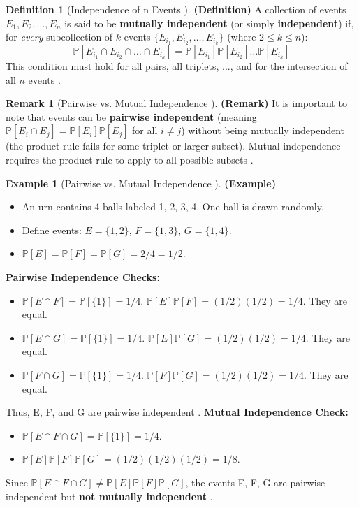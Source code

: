 \documentclass[12pt, a4paper]{article}
\theoremstyle{definition}
\newtheorem{definition}{Definition}[section]
\newtheorem{example}{Example}[section] %
\newtheorem{remark}{Remark}[section]
\theoremstyle{plain}
\newcommand{\Prob}[1]{\mathbb{P}\left[#1\right]} %
\newcommand{\intersect}{\cap} %
\begin{document}
\begin{definition}[Independence of n Events \cite{FacultyNotes, Ross}]
\textbf{(Definition)} A collection of events $E_1, E_2, \dots, E_n$ is said to be \textbf{mutually independent} (or simply \textbf{independent}) if, for \textit{every} subcollection of $k$ events $\{E_{i_1}, E_{i_2}, \dots, E_{i_k}\}$ (where $2 \le k \le n$):
\[ \Prob{E_{i_1} \intersect E_{i_2} \intersect \dots \intersect E_{i_k}} = \Prob{E_{i_1}}\Prob{E_{i_2}}\dots\Prob{E_{i_k}} \]
This condition must hold for all pairs, all triplets, ..., and for the intersection of all $n$ events \cite{Ross, FacultyNotes}.
\end{definition}

\begin{remark}[Pairwise vs. Mutual Independence \cite{Ross, Chan}]
\textbf{(Remark)} It is important to note that events can be \textbf{pairwise independent} (meaning $\Prob{E_i \intersect E_j} = \Prob{E_i}\Prob{E_j}$ for all $i \neq j$) without being mutually independent (the product rule fails for some triplet or larger subset). Mutual independence requires the product rule to apply to all possible subsets \cite{Ross, Chan}.
\end{remark}

\begin{example}[Pairwise vs. Mutual Independence \cite{Ross}]
\textbf{(Example)}
\begin{itemize}
    \item An urn contains 4 balls labeled 1, 2, 3, 4. One ball is drawn randomly.
    \item Define events: $E = \{1, 2\}$, $F = \{1, 3\}$, $G = \{1, 4\}$.
    \item $\Prob{E} = \Prob{F} = \Prob{G} = 2/4 = 1/2$.
\end{itemize}
\textbf{Pairwise Independence Checks:}
\begin{itemize}
    \item $\Prob{E \intersect F} = \Prob{\{1\}} = 1/4$. $\Prob{E}\Prob{F} = (1/2)(1/2) = 1/4$. They are equal.
    \item $\Prob{E \intersect G} = \Prob{\{1\}} = 1/4$. $\Prob{E}\Prob{G} = (1/2)(1/2) = 1/4$. They are equal.
    \item $\Prob{F \intersect G} = \Prob{\{1\}} = 1/4$. $\Prob{F}\Prob{G} = (1/2)(1/2) = 1/4$. They are equal.
\end{itemize}
Thus, E, F, and G are pairwise independent \cite{Ross}.
\textbf{Mutual Independence Check:}
\begin{itemize}
    \item $\Prob{E \intersect F \intersect G} = \Prob{\{1\}} = 1/4$.
    \item $\Prob{E}\Prob{F}\Prob{G} = (1/2)(1/2)(1/2) = 1/8$.
\end{itemize}
Since $\Prob{E \intersect F \intersect G} \neq \Prob{E}\Prob{F}\Prob{G}$, the events E, F, G are pairwise independent but \textbf{not mutually independent} \cite{Ross}.
\end{example}
\end{document}
